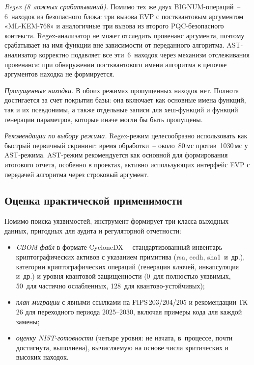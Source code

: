 \documentclass{itmo-vkr}
\begin{document}
\textit{Regex (8~ложных срабатываний).}
Помимо тех же двух BIGNUM-операций~-- 6~находок из безопасного
блока: три вызова EVP с постквантовым аргументом «ML-KEM-768»
и аналогичные три вызова из второго PQC-безопасного контекста.
Regex-анализатор не может отследить провенанс аргумента,
поэтому срабатывает на имя функции вне зависимости от
переданного алгоритма.
AST-анализатор корректно подавляет все эти~6~находок через
механизм отслеживания провенанса: при обнаружении постквантового
имени алгоритма в цепочке аргументов находка не формируется.

\noindent\textit{Пропущенные находки.}\quad
В обоих режимах пропущенных находок нет.
Полнота достигается за счет покрытия базы: она включает
как основные имена функций, так и их псевдонимы, а также
отдельные записи для хеш-функций и функций генерации параметров,
которые иначе могли бы быть пропущены.

\noindent\textit{Рекомендации по выбору режима.}\quad
Regex-режим целесообразно использовать как быстрый первичный
скрининг: время обработки~-- около~80\,мс против~1030\,мс
у AST-режима.
AST-режим рекомендуется как основной для формирования итогового
отчета, особенно в проектах, активно использующих интерфейс EVP
с передачей алгоритма через строковый аргумент.

\subsection{Оценка практической применимости}

Помимо поиска уязвимостей, инструмент формирует три класса
выходных данных, пригодных для аудита и регуляторной отчетности:
\begin{itemize}
  \item \textit{CBOM-файл} в формате CycloneDX~-- стандартизованный
    инвентарь криптографических активов с указанием примитива
    (rsa, ecdh, sha1~и~др.), категории криптографических операций
    (генерация ключей, инкапсуляция и~др.) и уровня квантовой
    защищенности (0~для полностью уязвимых, 50~для частично
    ослабленных, 128~для квантово-устойчивых);
  \item \textit{план миграции} с явными ссылками на FIPS\,203/204/205
    и рекомендации ТК\,26 для переходного периода 2025--2030, включая
    примеры кода для каждой замены;
  \item \textit{оценку NIST-готовности} (четыре уровня: не начата,
    в~процессе, почти достигнута, выполнена), вычисляемую
    на основе числа критических и высоких находок.
\end{itemize}
\end{document}
